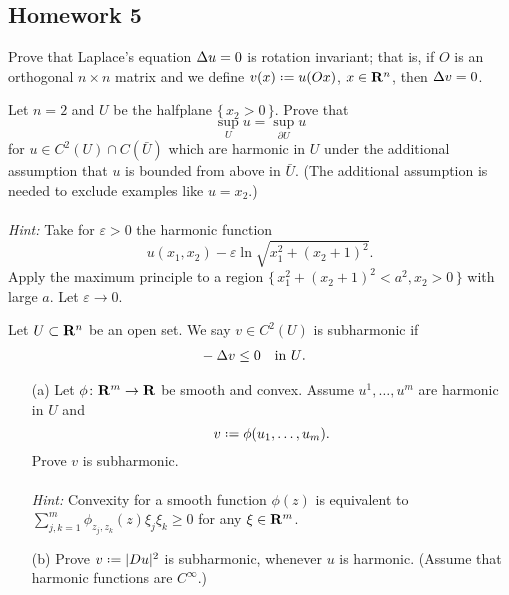 \subsection{Homework 5}
\begin{problem}
  Prove that Laplace's equation \(\Delta u=0\) is rotation invariant; that
  is, if \(O\) is an orthogonal \(n\times n\) matrix and we define
  \(v(x)\defeq u(Ox)\), \(x\in\mathbf{R}^n\), then \(\Delta v=0\).
\end{problem}
\begin{solution*}
\end{solution*}

\begin{problem}
  Let \(n=2\) and \(U\) be the halfplane \(\{\,x_2>0\,\}\). Prove that
  \[
    \sup_U u=\sup_{\partial U}u
  \]
  for \(u\in C^2(U)\cap C(\bar U)\) which are harmonic in \(U\) under the
  additional assumption that \(u\) is bounded from above in \(\bar
  U\). (The additional assumption is needed to exclude examples like
  \(u=x_2\).)
  \\\\
  \emph{Hint:} Take for \(\varepsilon>0\) the harmonic function
  \[
    u(x_1,x_2)-\varepsilon\ln\sqrt{x_1^2+(x_2+1)^2}.
  \]
  Apply the maximum principle to a region
  \(\bigl\{\,x_1^2+(x_2+1)^2<a^2,x_2>0\,\bigr\}\) with large \(a\). Let
  \(\varepsilon\to 0\).
\end{problem}
\begin{solution*}
\end{solution*}

\begin{problem}
  Let \(U\subset\R^n\) be an open set. We say \(v \in C^2(U)\) is
  subharmonic if
  \[
    \begin{aligned}
      &-\Delta v\leq 0&&\text{in \(U\).}
    \end{aligned}
  \]
  \begin{itemize}
  \item[(a)] Let \(\phi\colon\R^m\to\R\) be smooth and
    convex. Assume \(u^1,\dotsc,u^m\) are harmonic in \(U\) and
    \[
      v\defeq\phi(u_1,\dotsc,u_m).
    \]
    Prove \(v\) is subharmonic.
    \\\\
    \emph{Hint:} Convexity for a smooth function \(\phi(z)\) is
    equivalent to \(\sum_{j,k=1}^m\phi_{z_j,z_k}(z)\xi_j\xi_k\geq 0\)
    for any \(\xi\in\mathbf{R}^m\).
  \item[(b)] Prove \(v\defeq|Du|^2\) is subharmonic, whenever \(u\) is
    harmonic. (Assume that harmonic functions are \(C^\infty\).)
  \end{itemize}
\end{problem}
\begin{solution*}
\end{solution*}

